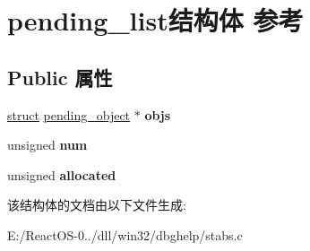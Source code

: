 \hypertarget{structpending__list}{}\section{pending\+\_\+list结构体 参考}
\label{structpending__list}
\subsection*{Public 属性}
\begin{DoxyCompactItemize}
\item 
\mbox{\label{structpending__list_a703c50a8ede362c94d733f7d1aed999b}} 
\hyperlink{interfacestruct}{struct} \hyperlink{structpending__object}{pending\+\_\+object} $\ast$ {\bfseries objs}
\item 
\mbox{\label{structpending__list_acca8988f15e77193c5fc95005fd46c81}} 
unsigned {\bfseries num}
\item 
\mbox{\label{structpending__list_a989a0c764081cb275888ced4611a11f8}} 
unsigned {\bfseries allocated}
\end{DoxyCompactItemize}


该结构体的文档由以下文件生成\+:\begin{DoxyCompactItemize}
\item 
E\+:/\+React\+O\+S-\/0../dll/win32/dbghelp/stabs.\+c\end{DoxyCompactItemize}
